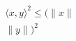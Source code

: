 \documentclass[preview]{standalone}
\begin{document}
\begin{align*}
\langle x,y \rangle^{2} \leq (\lVert x \rVert \\ \lVert y \rVert)^{2}
\end{align*}
\end{document}
